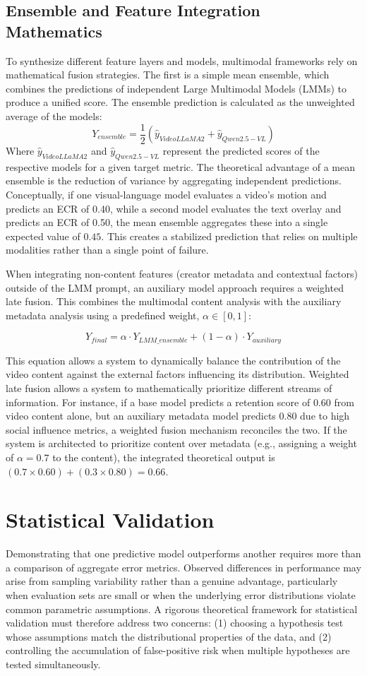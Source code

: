 \subsection{Ensemble and Feature Integration Mathematics}
To synthesize different feature layers and models, multimodal frameworks rely on mathematical fusion strategies. The first is a simple mean ensemble, which combines the predictions of independent Large Multimodal Models (LMMs) to produce a unified score. The ensemble prediction is calculated as the unweighted average of the models:
$$Y_{ensemble}=\frac{1}{2}(\hat{y}_{VideoLLaMA2}+\hat{y}_{Qwen2.5-VL})$$
Where $\hat{y}_{VideoLLaMA2}$ and $\hat{y}_{Qwen2.5-VL}$ represent the predicted scores of the respective models for a given target metric. The theoretical advantage of a mean ensemble is the reduction of variance by aggregating independent predictions. Conceptually, if one visual-language model evaluates a video's motion and predicts an ECR of 0.40, while a second model evaluates the text overlay and predicts an ECR of 0.50, the mean ensemble aggregates these into a single expected value of $0.45$. This creates a stabilized prediction that relies on multiple modalities rather than a single point of failure.

When integrating non-content features (creator metadata and contextual factors) outside of the LMM prompt, an auxiliary model approach requires a weighted late fusion. This combines the multimodal content analysis with the auxiliary metadata analysis using a predefined weight, $\alpha \in [0,1]$:

$$Y_{final}=\alpha \cdot Y_{LMM\_ensemble}+(1-\alpha)\cdot Y_{auxiliary}$$

This equation allows a system to dynamically balance the contribution of the video content against the external factors influencing its distribution. Weighted late fusion allows a system to mathematically prioritize different streams of information. For instance, if a base model predicts a retention score of $0.60$ from video content alone, but an auxiliary metadata model predicts $0.80$ due to high social influence metrics, a weighted fusion mechanism reconciles the two. If the system is architected to prioritize content over metadata (e.g., assigning a weight of $\alpha = 0.7$ to the content), the integrated theoretical output is $(0.7 \times 0.60) + (0.3 \times 0.80) = 0.66$.



\section{Statistical Validation}
Demonstrating that one predictive model outperforms another requires more than a comparison of aggregate error metrics. Observed differences in performance may arise from sampling variability rather than a genuine advantage, particularly when evaluation sets are small or when the underlying error distributions violate common parametric assumptions. A rigorous theoretical framework for statistical validation must therefore address two concerns: (1) choosing a hypothesis test whose assumptions match the distributional properties of the data, and (2) controlling the accumulation of false-positive risk when multiple hypotheses are tested simultaneously.

